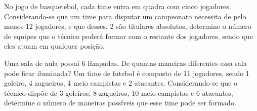\item No jogo de basquetebol, cada time entra em quadra com cinco jogadores. Considerando-se que um time para disputar um campeonato necessita de pelo menos 12 jogadores, e que desses, 2 são titulares absolutos, determine o número de equipes que o técnico poderá formar com o restante dos jogadores, sendo que eles atuam em qualquer posição.

\item Uma sala de aula possui 6 lâmpadas. De quantas maneiras diferentes essa sala pode ficar iluminada?
Um time de futebol é composto de 11 jogadores, sendo 1 goleiro, 4 zagueiros, 4 meio campistas e 2 atacantes. Considerando-se que o técnico dispõe de 3 goleiros, 8 zagueiros, 10 meio campistas e 6 atacantes, determine o número de maneiras possíveis que esse time pode ser formado.


	